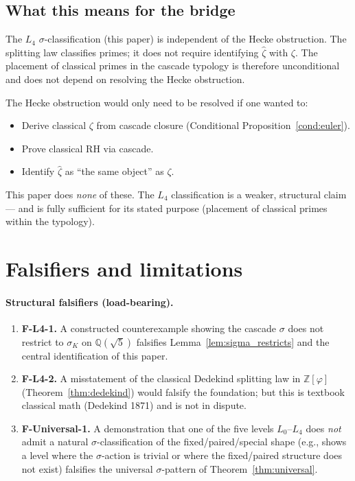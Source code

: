 \documentclass[11pt,a4paper]{article}
\theoremstyle{definition}
\theoremstyle{remark}
\begin{document}
\subsection{What this means for the bridge}

The $L_4$ $\sigma$-classification (this paper) is independent of the
Hecke obstruction. The splitting law classifies primes; it does not
require identifying $\hat{\zeta}$ with $\zeta$. The placement of
classical primes in the cascade typology is therefore unconditional and
does not depend on resolving the Hecke obstruction.

The Hecke obstruction would only need to be resolved if one wanted to:

\begin{itemize}\itemsep0pt
  \item Derive classical $\zeta$ from cascade closure (Conditional Proposition~\ref{cond:euler}).
  \item Prove classical RH via cascade.
  \item Identify $\hat{\zeta}$ as ``the same object'' as $\zeta$.
\end{itemize}

This paper does \emph{none} of these. The $L_4$ classification is a
weaker, structural claim --- and is fully sufficient for its stated
purpose (placement of classical primes within the typology).

\section{Falsifiers and limitations}\label{sec:falsifiers}

\paragraph{Structural falsifiers (load-bearing).}
\begin{enumerate}\itemsep0pt
  \item \textbf{F-L4-1.} A constructed counterexample showing the cascade $\sigma$ does not restrict to $\sigma_K$ on $\mathbb{Q}(\sqrt{5})$ falsifies Lemma~\ref{lem:sigma_restricts} and the central identification of this paper.
  \item \textbf{F-L4-2.} A misstatement of the classical Dedekind splitting law in $\mathbb{Z}[\varphi]$ (Theorem~\ref{thm:dedekind}) would falsify the foundation; but this is textbook classical math (Dedekind 1871) and is not in dispute.
  \item \textbf{F-Universal-1.} A demonstration that one of the five levels $L_0$--$L_4$ does \emph{not} admit a natural $\sigma$-classification of the fixed/paired/special shape (e.g., shows a level where the $\sigma$-action is trivial or where the fixed/paired structure does not exist) falsifies the universal $\sigma$-pattern of Theorem~\ref{thm:universal}.
\end{enumerate}
\end{document}

